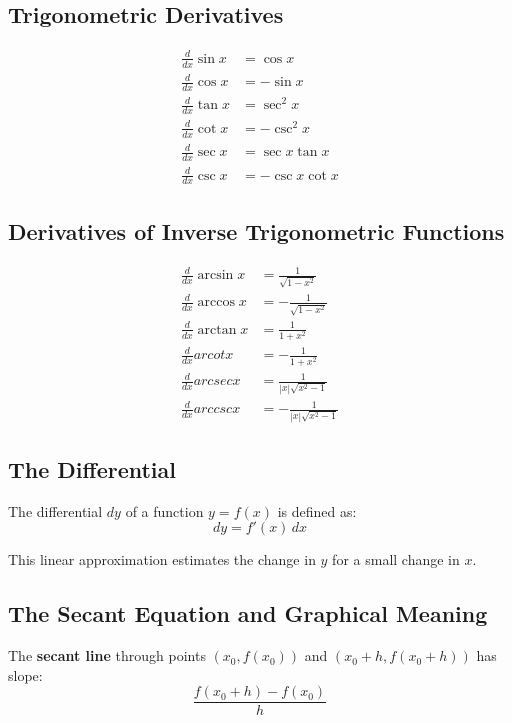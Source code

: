 \subsection{Trigonometric Derivatives}

\begin{align*}
\frac{d}{dx} \sin x &= \cos x \\
\frac{d}{dx} \cos x &= -\sin x \\
\frac{d}{dx} \tan x &= \sec^2 x \\
\frac{d}{dx} \cot x &= -\csc^2 x \\
\frac{d}{dx} \sec x &= \sec x \tan x \\
\frac{d}{dx} \csc x &= -\csc x \cot x
\end{align*}

\subsection{Derivatives of Inverse Trigonometric Functions}

\begin{align*}
\frac{d}{dx} \arcsin x &= \frac{1}{\sqrt{1 - x^2}} \\
\frac{d}{dx} \arccos x &= -\frac{1}{\sqrt{1 - x^2}} \\
\frac{d}{dx} \arctan x &= \frac{1}{1 + x^2} \\
\frac{d}{dx} arcot x &= -\frac{1}{1 + x^2} \\
\frac{d}{dx} arcsec x &= \frac{1}{|x|\sqrt{x^2 - 1}} \\
\frac{d}{dx} arccsc x &= -\frac{1}{|x|\sqrt{x^2 - 1}}
\end{align*}

\subsection{The Differential}

The differential \(dy\) of a function \(y = f(x)\) is defined as:
\[
dy = f'(x) \, dx
\]

This linear approximation estimates the change in \(y\) for a small change in \(x\).

\subsection{The Secant Equation and Graphical Meaning}

The \textbf{secant line} through points \((x_0, f(x_0))\) and \((x_0 + h, f(x_0 + h))\) has slope:
\[
\frac{f(x_0 + h) - f(x_0)}{h}
\]

